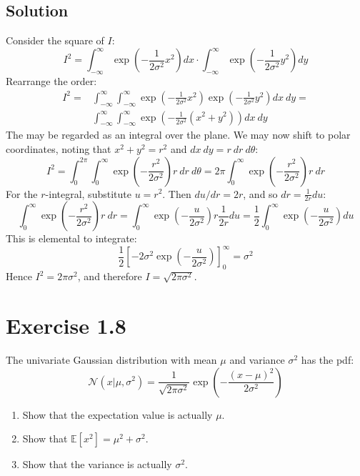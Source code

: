 \documentclass[12pt, a4paper]{article}
\numberwithin{equation}{section}
\begin{document}
\subsection{Solution}
Consider the square of $I$:
\begin{equation}
I^2=\int_{-\infty}^\infty\exp\left(-\frac{1}{2\sigma^2}x^2\right)dx\cdot\int_{-\infty}^\infty\exp\left(-\frac{1}{2\sigma^2}y^2\right)dy
\end{equation}
Rearrange the order:
\begin{align}
I^2=&\int_{-\infty}^\infty\int_{-\infty}^\infty\exp\left(-\frac{1}{2\sigma^2}x^2\right)\exp\left(-\frac{1}{2\sigma^2}y^2\right)dx\ dy=\\
&\int_{-\infty}^\infty\int_{-\infty}^\infty\exp\left(-\frac{1}{2\sigma^2}(x^2+y^2)\right)dx\ dy
\end{align}
The may be regarded as an integral over the plane. We may now shift to polar coordinates, noting that $x^2+y^2=r^2$ and $dx\ dy=r\ dr\ d\theta$:
\begin{equation}
I^2=\int_0^{2\pi}\int_0^\infty\exp\left(-\frac{r^2}{2\sigma^2}\right)r\ dr\ d\theta=2\pi\int_0^\infty\exp\left(-\frac{r^2}{2\sigma^2}\right)r\ dr
\end{equation}
For the $r$-integral, substitute $u=r^2$. Then $du/dr=2r$, and so $dr=\frac{1}{2r}du$:
\begin{equation}
\int_0^\infty\exp\left(-\frac{r^2}{2\sigma^2}\right)r\ dr=\int_0^\infty\exp\left(-\frac{u}{2\sigma^2}\right)r\frac{1}{2r}du=\frac{1}{2}\int_0^\infty\exp\left(-\frac{u}{2\sigma^2}\right)du
\end{equation}
This is elemental to integrate:
\begin{equation}
\frac{1}{2}\left[-2\sigma^2\exp\left(-\frac{u}{2\sigma^2}\right)\right]_0^\infty=\sigma^2
\end{equation}
Hence $I^2=2\pi\sigma^2$, and therefore $I=\sqrt{2\pi\sigma^2}$.

\section{Exercise 1.8}
The univariate Gaussian distribution with mean $\mu$ and variance $\sigma^2$ has the pdf:
\begin{equation}
\mathcal{N}(x|\mu,\sigma^2)=\frac{1}{\sqrt{2\pi\sigma^2}}\exp\left(-\frac{(x-\mu)^2}{2\sigma^2}\right)
\end{equation}
\begin{enumerate}
\item Show that the expectation value is actually $\mu$.
\item Show that $\mathbb{E}[x^2]=\mu^2+\sigma^2$.
\item Show that the variance is actually $\sigma^2$.
\end{enumerate}
\end{document}
